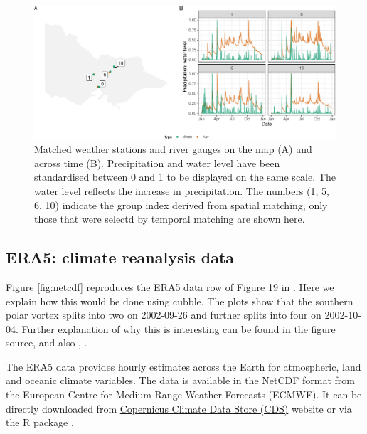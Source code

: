 \documentclass[
]{jss}
\begin{document}
\begin{CodeChunk}
\begin{figure}

{\centering \includegraphics[width=1\linewidth]{figures/matching-1} 

}

\caption[Matched weather stations and river gauges on the map (A) and across time (B)]{Matched weather stations and river gauges on the map (A) and across time (B). Precipitation and water level have been standardised between 0 and 1 to be displayed on the same scale. The water level reflects the increase in precipitation. The numbers (1, 5, 6, 10) indicate the group index derived from spatial matching, only those that were selectd by temporal matching are shown here.}\label{fig:matching}
\end{figure}
\end{CodeChunk}

\hypertarget{era5-climate-reanalysis-data}{%
\subsection{ERA5: climate reanalysis data}\label{era5-climate-reanalysis-data}}

Figure \ref{fig:netcdf} reproduces the ERA5 data row of Figure 19 in \citet{hersbach2020era5}. Here we explain how this would be done using cubble. The plots show that the southern polar vortex splits into two on 2002-09-26 and further splits into four on 2002-10-04. Further explanation of why this is interesting can be found in the figure source, and also \citet{simmons2020global}, \citet{simmons2005ecmwf}.

The ERA5 data \citep{hersbach2020era5} provides hourly estimates across the Earth for atmospheric, land and oceanic climate variables. The data is available in the NetCDF format from the European Centre for Medium-Range Weather Forecasts (ECMWF). It can be directly downloaded from \href{https://cds.climate.copernicus.eu/cdsapp\#!/dataset/reanalysis-era5-pressure-levels?tab=overview}{Copernicus Climate Data Store (CDS)} website or via the R package  \citep{ecwmfr}.
\end{document}
